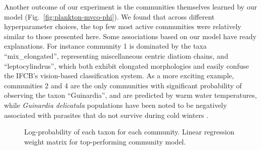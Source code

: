 Another outcome of our experiment is the communities themselves learned by our model (Fig.~\ref{fig:plankton-mvco-phi}). We found that across different hyperparameter choices, the top few most active communities were relatively similar to those presented here. Some associations based on our model have ready explanations. For instance community 1 is dominated by the taxa ``mix\_elongated'', representing miscellaneous centric diatiom chains, and ``leptocylindrus'', which both exhibit elongated morphologies and easily confuse the IFCB's vision-based classification system. As a more exciting example, communities 2 and 4 are the only communities with significant probability of observing the taxon ``Guinardia'', and are predicted by warm water temperatures, while \emph{Guinardia delicatula} populations have been noted to be negatively associated with parasites that do not survive during cold winters \citep{peacock2014parasitic}.

\begin{figure}
    \begin{center}
    \end{center}

    \caption{
        \protect{} Log-probability of each taxon for each community.
        \protect{} Linear regression weight matrix for top-performing community model.
    }
    \label{fig:plankton-mvco-supplemental}
\end{figure}

